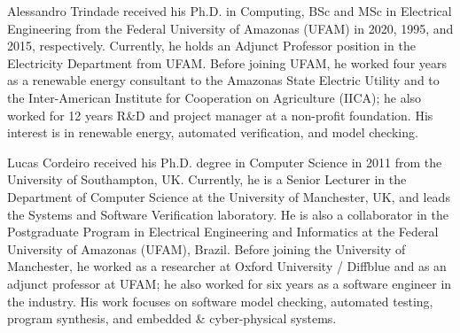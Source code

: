\documentclass[10pt,journal,compsoc]{IEEEtran}
\begin{document}
\begin{IEEEbiography}
    {Alessandro Trindade}
received his Ph.D. in Computing, BSc and MSc in Electrical Engineering from the Federal University of Amazonas (UFAM) in 2020, 1995, and 2015, respectively. Currently, he holds an Adjunct Professor position in the Electricity Department from UFAM. Before joining UFAM, he worked four years as a renewable energy consultant to the Amazonas State Electric Utility and to the Inter-American Institute for Cooperation on Agriculture (IICA); he also worked for 12 years R\&D and project manager at a non-profit foundation. His interest is in renewable energy, automated verification, and model checking.
\end{IEEEbiography}

\begin{IEEEbiography}
    {Lucas Cordeiro}
received his Ph.D. degree in Computer Science in 2011 from the University of Southampton, UK. Currently, he is a Senior Lecturer in the Department of Computer Science at the University of Manchester, UK, and leads the Systems and Software Verification laboratory. He is also a collaborator in the Postgraduate Program in Electrical Engineering and Informatics at the Federal University of Amazonas (UFAM), Brazil. Before joining the University of Manchester, he worked as a researcher at Oxford University / Diffblue and as an adjunct professor at UFAM; he also worked for six years as a software engineer in the industry. His work focuses on software model checking, automated testing, program synthesis, and embedded \& cyber-physical systems.
\end{IEEEbiography}
\end{document}
